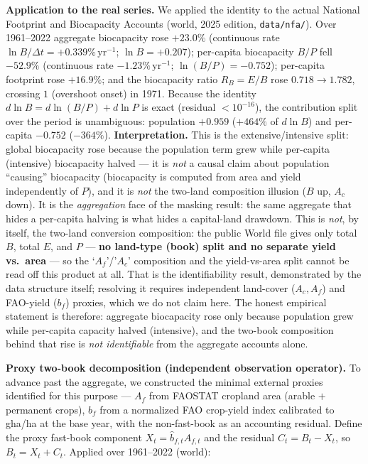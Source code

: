 \documentclass[11pt]{article}
\begin{document}
\noindent\textbf{Application to the real series.} We applied the identity to the actual National Footprint and Biocapacity Accounts (world, 2025 edition, \texttt{data/nfa/}). Over 1961--2022 aggregate biocapacity rose $+23.0\%$ (continuous rate $\ln B/\Delta t=+0.339\%\,\text{yr}^{-1}$; $\ln B=+0.207$); per-capita biocapacity $B/P$ fell $-52.9\%$ (continuous rate $-1.23\%\,\text{yr}^{-1}$; $\ln(B/P)=-0.752$); per-capita footprint rose $+16.9\%$; and the biocapacity ratio $R_B=E/B$ rose $0.718\to1.782$, crossing $1$ (overshoot onset) in 1971. Because the identity $d\ln B=d\ln(B/P)+d\ln P$ is exact (residual $<10^{-16}$), the contribution split over the period is unambiguous: population $+0.959$ ($+464\%$ of $d\ln B$) and per-capita $-0.752$ ($-364\%$). \textbf{Interpretation.} This is the extensive/intensive split: global biocapacity rose because the population term grew while per-capita (intensive) biocapacity halved --- it is \emph{not} a causal claim about population ``causing'' biocapacity (biocapacity is computed from area and yield independently of $P$), and it is \emph{not} the two-land composition illusion ($B$ up, $A_c$ down). It is the \emph{aggregation} face of the masking result: the same aggregate that hides a per-capita halving is what hides a capital-land drawdown. This is \emph{not}, by itself, the two-land conversion composition: the public World file gives only total $B$, total $E$, and $P$ --- \textbf{no land-type (book) split and no separate yield vs.\ area} --- so the `$A_f$'/'$A_c$' composition and the yield-vs-area split cannot be read off this product at all. That is the identifiability result, demonstrated by the data structure itself; resolving it requires independent land-cover ($A_c,A_f$) and FAO-yield ($b_f$) proxies, which we do not claim here. The honest empirical statement is therefore: aggregate biocapacity rose only because population grew while per-capita capacity halved (intensive), and the two-book composition behind that rise is \emph{not identifiable} from the aggregate accounts alone.

\noindent\textbf{Proxy two-book decomposition (independent observation operator).} To advance past the aggregate, we
constructed the minimal external proxies identified for this purpose --- $A_f$ from FAOSTAT cropland area
(arable $+$ permanent crops), $b_f$ from a normalized FAO crop-yield index calibrated to gha/ha at the base year,
with the non-fast-book as an accounting residual. Define the proxy fast-book component $X_t=\hat b_{f,t}A_{f,t}$
and the residual $C_t=B_t-X_t$, so $B_t=X_t+C_t$. Applied over 1961--2022 (world):
\end{document}
